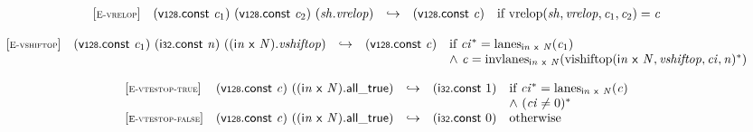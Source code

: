 \vspace{1ex}

$$
\begin{array}{@{}l@{}lcl@{}l@{}}
{[\textsc{\scriptsize E{-}vrelop}]} \quad & (\mathsf{v{\scriptstyle128}}.\mathsf{const}~{\mathit{c}}_{{1}})~(\mathsf{v{\scriptstyle128}}.\mathsf{const}~{\mathit{c}}_{{2}})~({\mathit{sh}} . {\mathit{vrelop}}) &\hookrightarrow& (\mathsf{v{\scriptstyle128}}.\mathsf{const}~{\mathit{c}}) &\quad
  \mbox{if}~{\mathrm{vrelop}}({\mathit{sh}}, {\mathit{vrelop}}, {\mathit{c}}_{{1}}, {\mathit{c}}_{{2}}) = {\mathit{c}} \\
\end{array}
$$

\vspace{1ex}

$$
\begin{array}{@{}l@{}lcl@{}l@{}}
{[\textsc{\scriptsize E{-}vshiftop}]} \quad & (\mathsf{v{\scriptstyle128}}.\mathsf{const}~{\mathit{c}}_{{1}})~(\mathsf{i{\scriptstyle32}}.\mathsf{const}~{\mathit{n}})~(({\mathsf{i}}{{\mathit{n}}}~\mathsf{x}~{\mathit{N}}) . {\mathit{vshiftop}}) &\hookrightarrow& (\mathsf{v{\scriptstyle128}}.\mathsf{const}~{\mathit{c}}) &\quad
  \mbox{if}~{{\mathit{ci}}^\ast} = {{\mathrm{lanes}}}_{{\mathsf{i}}{{\mathit{n}}}~\mathsf{x}~{\mathit{N}}}({\mathit{c}}_{{1}}) \\
 &&&&\quad {\land}~{\mathit{c}} = {{\mathrm{invlanes}}}_{{\mathsf{i}}{{\mathit{n}}}~\mathsf{x}~{\mathit{N}}}({{\mathrm{vishiftop}}({\mathsf{i}}{{\mathit{n}}}~\mathsf{x}~{\mathit{N}}, {\mathit{vshiftop}}, {\mathit{ci}}, {\mathit{n}})^\ast}) \\
\end{array}
$$

\vspace{1ex}

$$
\begin{array}{@{}l@{}lcl@{}l@{}}
{[\textsc{\scriptsize E{-}vtestop{-}true}]} \quad & (\mathsf{v{\scriptstyle128}}.\mathsf{const}~{\mathit{c}})~(({\mathsf{i}}{{\mathit{n}}}~\mathsf{x}~{\mathit{N}}) . \mathsf{all\_true}) &\hookrightarrow& (\mathsf{i{\scriptstyle32}}.\mathsf{const}~1) &\quad
  \mbox{if}~{{\mathit{ci}}^\ast} = {{\mathrm{lanes}}}_{{\mathsf{i}}{{\mathit{n}}}~\mathsf{x}~{\mathit{N}}}({\mathit{c}}) \\
 &&&&\quad {\land}~({\mathit{ci}} \neq 0)^\ast \\
{[\textsc{\scriptsize E{-}vtestop{-}false}]} \quad & (\mathsf{v{\scriptstyle128}}.\mathsf{const}~{\mathit{c}})~(({\mathsf{i}}{{\mathit{n}}}~\mathsf{x}~{\mathit{N}}) . \mathsf{all\_true}) &\hookrightarrow& (\mathsf{i{\scriptstyle32}}.\mathsf{const}~0) &\quad
  \mbox{otherwise} \\
\end{array}
$$

